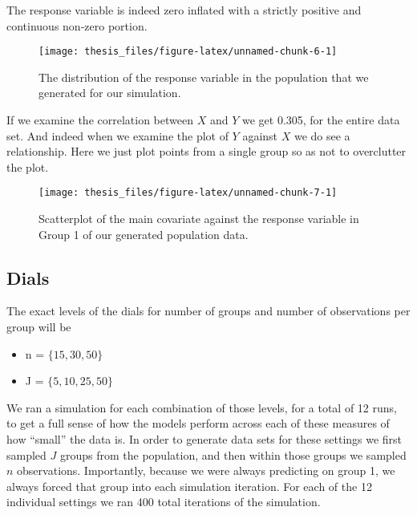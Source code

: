 \documentclass[12pt,twoside]{reedthesis}
\providecommand{\tightlist}{%
  \setlength{\itemsep}{0pt}\setlength{\parskip}{0pt}}
\begin{document}
The response variable is indeed zero inflated with a strictly positive and continuous non-zero portion.
\begin{figure}

{\centering \texttt{[image: thesis\_files/figure-latex/unnamed-chunk-6-1]} 

}

\caption{The distribution of the response variable in the population that we generated for our simulation.}\label{fig:unnamed-chunk-6}
\end{figure}
If we examine the correlation between \(X\) and \(Y\) we get 0.305, for the entire data set. And indeed when we examine the plot of \(Y\) against \(X\) we do see a relationship. Here we just plot points from a single group so as not to overclutter the plot.
\begin{figure}

{\centering \texttt{[image: thesis\_files/figure-latex/unnamed-chunk-7-1]} 

}

\caption{Scatterplot of the main covariate against the response variable in Group 1 of our generated population data.}\label{fig:unnamed-chunk-7}
\end{figure}
\hypertarget{dials}{%
\subsection{Dials}\label{dials}}

The exact levels of the dials for number of groups and number of observations per group will be
\begin{itemize}
\tightlist
\item
  n = \(\{15, 30, 50\}\)
\item
  J = \(\{5, 10, 25, 50\}\)
\end{itemize}
We ran a simulation for each combination of those levels, for a total of 12 runs, to get a full sense of how the models perform across each of these measures of how ``small'' the data is. In order to generate data sets for these settings we first sampled \(J\) groups from the population, and then within those groups we sampled \(n\) observations. Importantly, because we were always predicting on group 1, we always forced that group into each simulation iteration. For each of the 12 individual settings we ran 400 total iterations of the simulation.
\end{document}
